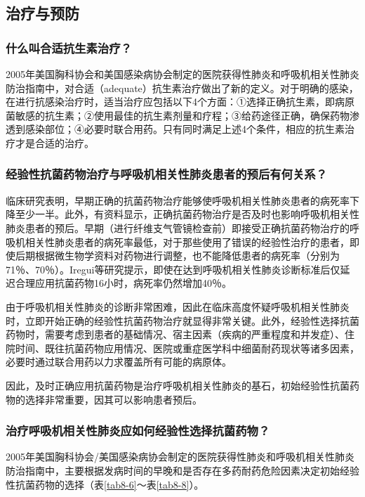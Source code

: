 \subsection{治疗与预防}

\subsubsection{什么叫合适抗生素治疗？}

2005年美国胸科协会和美国感染病协会制定的医院获得性肺炎和呼吸机相关性肺炎防治指南中，对合适（adequate）抗生素治疗做出了新的定义。对于明确的感染，在进行抗感染治疗时，适当治疗应包括以下4个方面：①选择正确抗生素，即病原菌敏感的抗生素；②使用最佳的抗生素剂量和疗程；③给药途径正确，确保药物渗透到感染部位；④必要时联合用药。只有同时满足上述4个条件，相应的抗生素治疗才是合适的治疗。

\subsubsection{经验性抗菌药物治疗与呼吸机相关性肺炎患者的预后有何关系？}

临床研究表明，早期正确的抗菌药物治疗能够使呼吸机相关性肺炎患者的病死率下降至少一半。此外，有资料显示，正确抗菌药物治疗是否及时也影响呼吸机相关性肺炎患者的预后。早期（进行纤维支气管镜检查前）即接受正确抗菌药物治疗的呼吸机相关性肺炎患者的病死率最低，对于那些使用了错误的经验性治疗的患者，即使后期根据微生物学资料对药物进行调整，也不能降低患者的病死率（分别为71％、70％）。Iregui等研究提示，即使在达到呼吸机相关性肺炎诊断标准后仅延迟合理应用抗菌药物16小时，病死率仍然增加40％。

由于呼吸机相关性肺炎的诊断非常困难，因此在临床高度怀疑呼吸机相关性肺炎时，立即开始正确的经验性抗菌药物治疗就显得非常关键。此外，经验性选择抗菌药物时，需要考虑到患者的基础情况、宿主因素（疾病的严重程度和并发症）、住院时间、既往抗菌药物应用情况、医院或重症医学科中细菌耐药现状等诸多因素，必要时通过联合用药以力求覆盖所有可能的病原体。

因此，及时正确应用抗菌药物是治疗呼吸机相关性肺炎的基石，初始经验性抗菌药物的选择非常重要，因其可以影响患者预后。

\subsubsection{治疗呼吸机相关性肺炎应如何经验性选择抗菌药物？}

2005年美国胸科协会/美国感染病协会制定的医院获得性肺炎和呼吸机相关性肺炎防治指南中，主要根据发病时间的早晚和是否存在多药耐药危险因素决定初始经验性抗菌药物的选择（表\ref{tab8-6}～表\ref{tab8-8}）。

